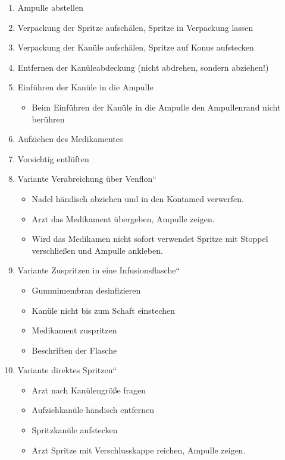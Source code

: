\begin{enumerate}
\begin{itemize}
\begin{itemize}
{}
        \end{itemize}
        \item Plastikampulle,
        {\quotedblbase}Dreh-und-Drink{\textquotedblleft}-Verschluss
        \begin{itemize}
            \item Den Verschlussknopf ohne Kontamination des Ampullenhalses
            (Sollbruchstelle) abdrehen
        \end{itemize}
    \end{itemize}
    \item Ampulle abstellen
    \item Verpackung der Spritze aufschälen, Spritze in Verpackung lassen
    \item Verpackung der Kanüle aufschälen, Spritze auf Konus aufstecken
    \item Entfernen der Kanüleabdeckung (nicht abdrehen, sondern
    abziehen!)
    \item Einführen der Kanüle in die Ampulle
    \begin{itemize}
        \item Beim Einführen der Kanüle in die Ampulle den Ampullenrand
        nicht berühren
    \end{itemize}
    \item Aufziehen des Medikamentes
    \item Vorsichtig entlüften
    \item Variante {\quotedblbase}Verabreichung über
    Venflon{\textquotedblleft}
    \begin{itemize}
        \item Nadel händisch abziehen und in den Kontamed verwerfen.
        \item Arzt das Medikament übergeben, Ampulle zeigen.
        \item Wird das Medikamen nicht sofort verwendet Spritze mit 
        Stoppel verschließen und Ampulle ankleben.
    \end{itemize}
    \item Variante {\quotedblbase}Zuspritzen in eine
    Infusionsflasche{\textquotedblleft}
    \begin{itemize}
        \item Gummimembran desinfizieren
        \item Kanüle nicht bis zum Schaft einstechen
        \item Medikament zuspritzen
        \item Beschriften der Flasche
    \end{itemize}
    \item Variante {\quotedblbase}direktes Spritzen{\textquotedblleft}
    \begin{itemize}
        \item Arzt nach Kanülengröße fragen
        \item Aufziehkanüle händisch entfernen
        \item Spritzkanüle aufstecken
        \item Arzt Spritze mit Verschlusskappe reichen, Ampulle zeigen.
    \end{itemize}
\end{enumerate}
